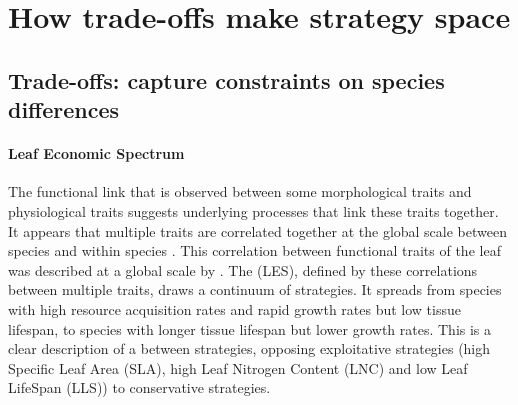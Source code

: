 



\section{How trade-offs make strategy space}

\subsection{Trade-offs: capture constraints on species differences}

\paragraph{Leaf Economic Spectrum}
The functional link that is observed between some morphological traits and physiological traits suggests underlying processes that link these traits together. It appears that multiple traits are correlated together at the global scale between species \parencite{reich_evolution_2003,     wright_worldwide_2004, chave_towards_2009, reich_world-wide_2014} and within species \parencite{hu_novel_2015}. This correlation between functional traits of the leaf was described at a global scale by \cite{wright_worldwide_2004}. The  (LES), defined by these correlations between multiple traits, draws a continuum of strategies. It spreads from species with high resource acquisition rates and rapid growth rates but low tissue lifespan, to species with longer tissue lifespan but lower growth rates. This is a clear description of a  between strategies, opposing exploitative strategies (high Specific Leaf Area (SLA), high Leaf Nitrogen Content (LNC) and low Leaf LifeSpan (LLS)) to conservative strategies.


